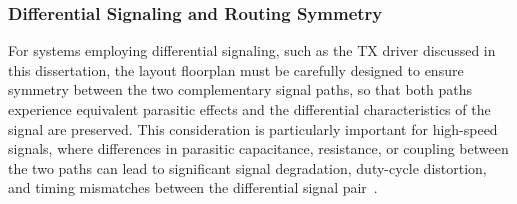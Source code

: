 

\subsubsection{Differential Signaling and Routing Symmetry}\label{sec:differential_routing_symmetry}

For systems employing differential signaling, such as the \ac{TX} driver discussed in this dissertation, the layout floorplan must be carefully designed to ensure symmetry between the two complementary signal paths, so that both paths experience equivalent parasitic effects and the differential characteristics of the signal are preserved\cite{chen_cml_review_2026}. This consideration is particularly important for high-speed signals, where differences in parasitic capacitance, resistance, or coupling between the two paths can lead to significant signal degradation, duty-cycle distortion, and timing mismatches between the differential signal pair~\cite{layout_fundamentals,bogatin_SI}.

